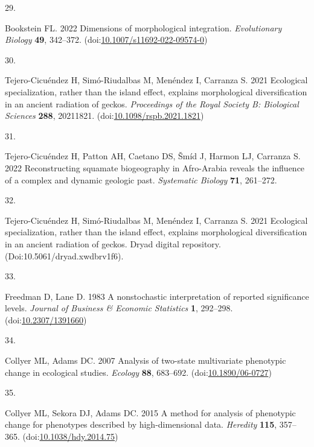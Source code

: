 \documentclass[
  11pt,
]{article}
\newlength{\cslhangindent}
\newlength{\csllabelwidth}
\newlength{\cslentryspacingunit} %
\newenvironment{CSLReferences}[2] %
 {%
  \setlength{\parindent}{0pt}
  \ifodd #1
  \let\oldpar\par
  \def\par{\hangindent=\cslhangindent\oldpar}
  \fi
  \setlength{\parskip}{#2\cslentryspacingunit}
 }%
 {}
\newcommand{\CSLLeftMargin}[1]{\parbox[t]{\csllabelwidth}{#1}}
\newcommand{\CSLRightInline}[1]{\parbox[t]{\linewidth - \csllabelwidth}{#1}\break}
\begin{document}
\begin{CSLReferences}{0}{0}
\leavevmode{}%
\CSLLeftMargin{29. }%
\CSLRightInline{Bookstein FL. 2022 Dimensions of morphological
integration. \emph{Evolutionary Biology} \textbf{49}, 342--372.
(doi:\href{https://doi.org/10.1007/s11692-022-09574-0}{10.1007/s11692-022-09574-0})}

\leavevmode{}%
\CSLLeftMargin{30. }%
\CSLRightInline{Tejero-Cicuéndez H, Simó-Riudalbas M, Menéndez I,
Carranza S. 2021 Ecological specialization, rather than the island
effect, explains morphological diversification in an ancient radiation
of geckos. \emph{Proceedings of the Royal Society B: Biological
Sciences} \textbf{288}, 20211821.
(doi:\href{https://doi.org/10.1098/rspb.2021.1821}{10.1098/rspb.2021.1821})}

\leavevmode{}%
\CSLLeftMargin{31. }%
\CSLRightInline{Tejero-Cicuéndez H, Patton AH, Caetano DS, Šmíd J,
Harmon LJ, Carranza S. 2022 Reconstructing squamate biogeography in
{A}fro-{A}rabia reveals the influence of a complex and dynamic geologic
past. \emph{Systematic Biology} \textbf{71}, 261--272.}

\leavevmode{}%
\CSLLeftMargin{32. }%
\CSLRightInline{Tejero-Cicuéndez H, Simó-Riudalbas M, Menéndez I,
Carranza S. 2021 Ecological specialization, rather than the island
effect, explains morphological diversification in an ancient radiation
of geckos. Dryad digital repository. (Doi:10.5061/dryad.xwdbrv1f6). }

\leavevmode{}%
\CSLLeftMargin{33. }%
\CSLRightInline{Freedman D, Lane D. 1983 A nonstochastic interpretation
of reported significance levels. \emph{Journal of Business {\&} Economic
Statistics} \textbf{1}, 292--298.
(doi:\href{https://doi.org/10.2307/1391660}{10.2307/1391660})}

\leavevmode{}%
\CSLLeftMargin{34. }%
\CSLRightInline{Collyer ML, Adams DC. 2007 Analysis of two-state
multivariate phenotypic change in ecological studies. \emph{Ecology}
\textbf{88}, 683--692.
(doi:\href{https://doi.org/10.1890/06-0727}{10.1890/06-0727})}

\leavevmode{}%
\CSLLeftMargin{35. }%
\CSLRightInline{Collyer ML, Sekora DJ, Adams DC. 2015 A method for
analysis of phenotypic change for phenotypes described by
high-dimensional data. \emph{Heredity} \textbf{115}, 357--365.
(doi:\href{https://doi.org/10.1038/hdy.2014.75}{10.1038/hdy.2014.75})}


\end{CSLReferences}
\end{document}
